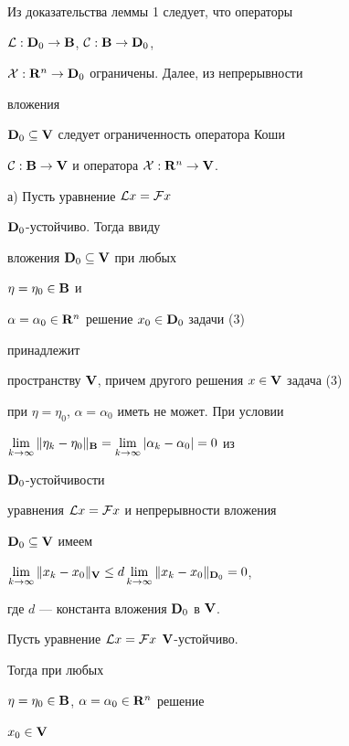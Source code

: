 \begin{pf}


Из доказательства леммы 1 следует, что операторы


${\cal L}:\bold {D}_0\to\bold {B}$, ${\cal C}:\bold {B}\to\bold {D}_0$,


${\cal X}:\bold {R}^n\to\bold {D}_0$ ограничены. Далее, из непрерывности


вложения


$\bold {D}_0\subseteq\bold {V}$ следует ограниченность оператора Коши


${\cal C}:\spc{B}\to\spc{V}$ и оператора ${\cal


X}:\spc{R}^n\to\spc{V}$.





а) Пусть уравнение ${\cal L}x={\cal F}x$\;


$\bold {D}_0$-устойчиво. Тогда ввиду


вложения $\bold {D}_0\subseteq\bold {V}$ при любых


$\eta=\eta_0\in\bold {B}$ и


$\alpha=\alpha_0\in\bold {R}^n$ решение $x_0\in\bold {D}_0$ задачи (3)


принадлежит


пространству $\bold {V}$, причем другого решения $x\in\bold {V}$ задача (3)


при $\eta=\eta_0$, $\alpha=\alpha_0$ иметь не может. При условии


$\lim\limits_{k\to\infty}\|\eta_k-\eta_0\|_{\bold B}=


\lim\limits_{k\to\infty}|\alpha_k-\alpha_0|=0$ из


$\bold {D}_0$-устойчивости


уравнения ${\cal L}x={\cal F}x$ и непрерывности вложения


$\bold {D}_0\subseteq\bold {V}$ имеем


$\lim\limits_{k\to\infty}\|x_k-x_0\|_{\bold V}\le


d\lim\limits_{k\to\infty}\|x_k-x_0\|_{\bold{D}_0}=0$,


где $d$ --- константа вложения $\bold {D}_0$ в $\bold {V}$.





Пусть уравнение ${\cal L}x={\cal F}x$\; $\bold {V}$-устойчиво.


Тогда при любых


$\eta=\eta_0\in\bold {B}$, $\alpha=\alpha_0\in\bold {R}^n$ решение


$x_0\in\bold {V}$



\end{pf}
